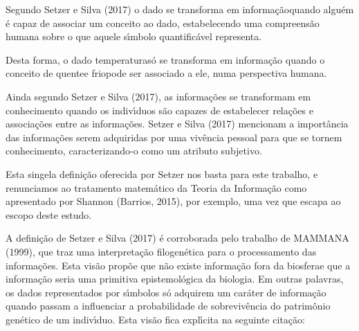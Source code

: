 \documentclass[
12pt,		%
openright,	%
twoside,  %
a4paper,			%
chapter=TITLE,		%
english,			%
french,				%
spanish,			%
brazil				%
]{USPSC-classe/USPSC_RedarTex}
\begin{document}
Segundo Setzer e Silva (2017) o dado se transforma em \textquotedbl informa\c{c}\~ao\textquotedbl  quando algu\'em \'e capaz de associar um conceito ao dado, estabelecendo uma compreens\~ao humana sobre o que aquele s\'{\i}mbolo quantific\'avel representa.








Desta forma, o dado \textquotedbl temperatura\textquotedbl  s\'o se transforma em informa\c{c}\~ao quando o conceito de \textquotedbl quente\textquotedbl  e \textquotedbl frio\textquotedbl  pode ser associado a ele, numa perspectiva humana.








Ainda segundo Setzer e Silva (2017), as informa\c{c}\~oes se transformam em conhecimento quando os indiv\'{\i}duos s\~ao capazes de estabelecer rela\c{c}\~oes e associa\c{c}\~oes entre as informa\c{c}\~oes.  Setzer e Silva (2017) mencionam a import\^ancia das informa\c{c}\~oes serem adquiridas por uma viv\^encia pessoal para que se tornem conhecimento, caracterizando-o como um atributo subjetivo.








Esta singela defini\c{c}\~ao oferecida por Setzer nos basta para este trabalho, e renunciamos ao tratamento matem\'atico da Teoria da Informa\c{c}\~ao como apresentado por Shannon (Barrios, 2015), por exemplo, uma vez que escapa ao escopo deste estudo.








A defini\c{c}\~ao de Setzer e Silva (2017) \'e corroborada pelo trabalho de MAMMANA (1999), que traz uma interpreta\c{c}\~ao filogen\'etica para o processamento das informa\c{c}\~oes. Esta vis\~ao prop\~oe que \textquotedbl n\~ao existe informa\c{c}\~ao fora da biosfera\textquotedbl  e que a informa\c{c}\~ao seria uma primitiva epistemol\'ogica da biologia. Em outras palavras, os dados representados por s\'{\i}mbolos s\'o adquirem um car\'ater de informa\c{c}\~ao quando passam a influenciar a probabilidade de sobreviv\^encia do patrim\^onio gen\'etico de um indiv\'{\i}duo. Esta vis\~ao fica expl\'{\i}cita na seguinte cita\c{c}\~ao:
\end{document}

